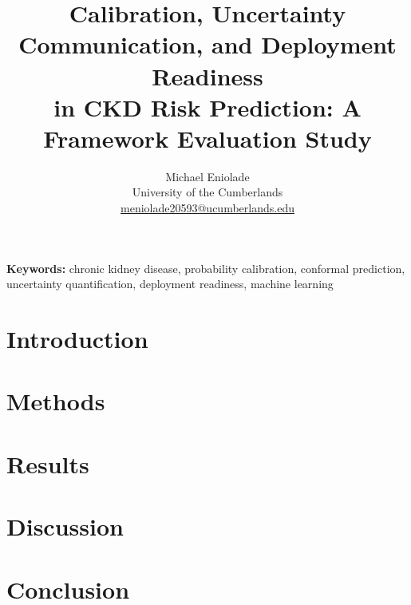\documentclass[12pt]{article}
\begin{document}
\title{Calibration, Uncertainty Communication, and Deployment Readiness\\
       in CKD Risk Prediction: A Framework Evaluation Study}

\author{Michael Eniolade\\
        \small University of the Cumberlands\\
        \small \href{mailto:meniolade20593@ucumberlands.edu}{meniolade20593@ucumberlands.edu}}

\date{}
\maketitle

\begin{abstract}

\end{abstract}

\noindent\textbf{Keywords:} chronic kidney disease, probability calibration,
conformal prediction, uncertainty quantification, deployment readiness,
machine learning

\section{Introduction}


\section{Methods}


\section{Results}


\section{Discussion}


\section{Conclusion}


\clearpage


\end{document}

